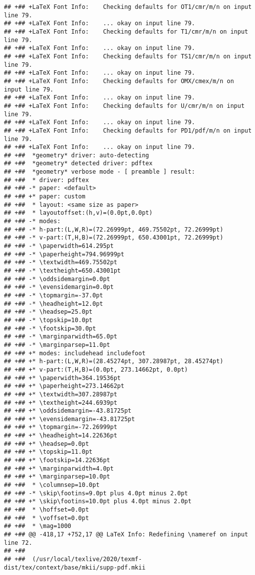 \documentclass[ignorenonframetext,]{beamer}
\begin{document}
\begin{verbatim}
## +## +LaTeX Font Info:    Checking defaults for OT1/cmr/m/n on input line 79.
## +## +LaTeX Font Info:    ... okay on input line 79.
## +## +LaTeX Font Info:    Checking defaults for T1/cmr/m/n on input line 79.
## +## +LaTeX Font Info:    ... okay on input line 79.
## +## +LaTeX Font Info:    Checking defaults for TS1/cmr/m/n on input line 79.
## +## +LaTeX Font Info:    ... okay on input line 79.
## +## +LaTeX Font Info:    Checking defaults for OMX/cmex/m/n on input line 79.
## +## +LaTeX Font Info:    ... okay on input line 79.
## +## +LaTeX Font Info:    Checking defaults for U/cmr/m/n on input line 79.
## +## +LaTeX Font Info:    ... okay on input line 79.
## +## +LaTeX Font Info:    Checking defaults for PD1/pdf/m/n on input line 79.
## +## +LaTeX Font Info:    ... okay on input line 79.
## +##  *geometry* driver: auto-detecting
## +##  *geometry* detected driver: pdftex
## +##  *geometry* verbose mode - [ preamble ] result:
## +##  * driver: pdftex
## +## -* paper: <default>
## +## +* paper: custom
## +##  * layout: <same size as paper>
## +##  * layoutoffset:(h,v)=(0.0pt,0.0pt)
## +## -* modes: 
## +## -* h-part:(L,W,R)=(72.26999pt, 469.75502pt, 72.26999pt)
## +## -* v-part:(T,H,B)=(72.26999pt, 650.43001pt, 72.26999pt)
## +## -* \paperwidth=614.295pt
## +## -* \paperheight=794.96999pt
## +## -* \textwidth=469.75502pt
## +## -* \textheight=650.43001pt
## +## -* \oddsidemargin=0.0pt
## +## -* \evensidemargin=0.0pt
## +## -* \topmargin=-37.0pt
## +## -* \headheight=12.0pt
## +## -* \headsep=25.0pt
## +## -* \topskip=10.0pt
## +## -* \footskip=30.0pt
## +## -* \marginparwidth=65.0pt
## +## -* \marginparsep=11.0pt
## +## +* modes: includehead includefoot 
## +## +* h-part:(L,W,R)=(28.45274pt, 307.28987pt, 28.45274pt)
## +## +* v-part:(T,H,B)=(0.0pt, 273.14662pt, 0.0pt)
## +## +* \paperwidth=364.19536pt
## +## +* \paperheight=273.14662pt
## +## +* \textwidth=307.28987pt
## +## +* \textheight=244.6939pt
## +## +* \oddsidemargin=-43.81725pt
## +## +* \evensidemargin=-43.81725pt
## +## +* \topmargin=-72.26999pt
## +## +* \headheight=14.22636pt
## +## +* \headsep=0.0pt
## +## +* \topskip=11.0pt
## +## +* \footskip=14.22636pt
## +## +* \marginparwidth=4.0pt
## +## +* \marginparsep=10.0pt
## +##  * \columnsep=10.0pt
## +## -* \skip\footins=9.0pt plus 4.0pt minus 2.0pt
## +## +* \skip\footins=10.0pt plus 4.0pt minus 2.0pt
## +##  * \hoffset=0.0pt
## +##  * \voffset=0.0pt
## +##  * \mag=1000
## +## @@ -418,17 +752,17 @@ LaTeX Info: Redefining \nameref on input line 72.
## +##  
## +##  (/usr/local/texlive/2020/texmf-dist/tex/context/base/mkii/supp-pdf.mkii

\end{verbatim}
\end{document}
